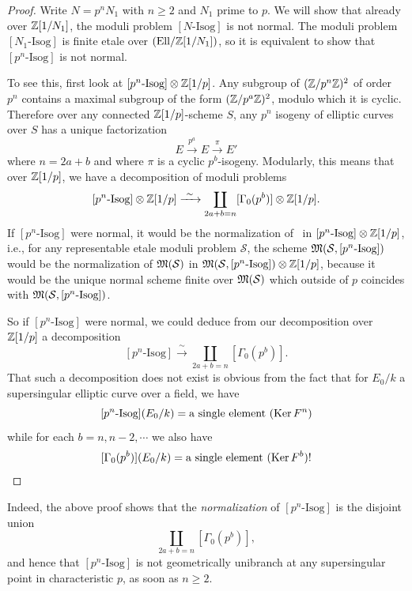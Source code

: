 \begin{proof}
Write $N = p^nN_1$ with $n \ge 2$ and $N_1$ prime to $p$. We will show that already over $\mathbb{Z}[1/N_1]$, the moduli problem $[N\text{-Isog}]$ is not normal. The moduli problem $[N_1\text{-Isog}]$ is finite etale over $(\mathrm{Ell}/\mathbb{Z}[1/N_1])$, so it is equivalent to show that $[p^n\text{-Isog}]$ is not normal.

To see this, first look at $[p^n\text{-Isog}] \otimes \mathbb{Z}[1/p]$. Any subgroup of $(\mathbb{Z}/p^n\mathbb{Z})^2$ of order $p^n$ contains a maximal subgroup of the form $(\mathbb{Z}/p^a\mathbb{Z})^2$, modulo which it is cyclic. Therefore over any connected $\mathbb{Z}[1/p]$-scheme $S$, any $p^n$ isogeny of elliptic curves over $S$ has a unique factorization
\[
E \xrightarrow{p^a} E \xrightarrow{\pi} E'
\]
where $n = 2a+b$ and where $\pi$ is a cyclic $p^b$-isogeny. Modularly, this means that over $\mathbb{Z}[1/p]$, we have a decomposition of moduli problems
\[
[p^n\text{-Isog}] \otimes \mathbb{Z}[1/p] \xrightarrow{\ \sim\ } \coprod_{2a+b=n} [\Gamma_0(p^b)] \otimes \mathbb{Z}[1/p] .
\]
If $[p^n\text{-Isog}]$ were normal, it would be the normalization of \Ell\ in $[p^n\text{-Isog}] \otimes \mathbb{Z}[1/p]$, i.e., for any representable etale moduli problem $\mathcal{S}$, the scheme $\mathfrak{M}(\mathcal{S}, [p^n\text{-Isog}])$ would be the normalization of $\mathfrak{M}(\mathcal{S})$ in $\mathfrak{M}(\mathcal{S}, [p^n\text{-Isog}]) \otimes \mathbb{Z}[1/p]$, because it would be the unique normal scheme finite over $\mathfrak{M}(\mathcal{S})$ which outside of $p$ coincides with $\mathfrak{M}(\mathcal{S}, [p^n\text{-Isog}])$.

So if $[p^n\text{-Isog}]$ were normal, we could deduce from our decomposition over $\mathbb{Z}[1/p]$ a decomposition
\[
[p^n\text{-Isog}] \xrightarrow{\ \sim\ } \coprod_{2a+b=n} [\Gamma_0(p^b)] .
\]
That such a decomposition does not exist is obvious from the fact that for $E_0/k$ a supersingular elliptic curve over a field, we have
\[
[p^n\text{-Isog}](E_0/k) = \text{a single element } (\operatorname{Ker} F^n)
\]
while for each $b = n, n-2, \cdots$ we also have
\[
[\Gamma_0(p^b)](E_0/k) = \text{a single element } (\operatorname{Ker} F^b) !
\]
\end{proof}

\begin{krem}\label{rem:6.8.9}
Indeed, the above proof shows that the \emph{normalization} of $[p^n\text{-Isog}]$ is the disjoint union
\[
\coprod_{2a+b=n} [\Gamma_0(p^b)] ,
\]
and hence that $[p^n\text{-Isog}]$ is not geometrically unibranch at any supersingular point in characteristic $p$, as soon as $n \ge 2$.
\end{krem}
